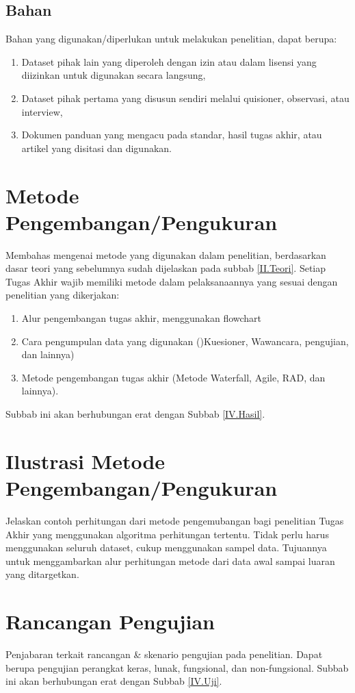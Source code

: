 \subsection{Bahan} \label{III.Bahan}
Bahan yang digunakan/diperlukan untuk melakukan penelitian, dapat berupa: \par
\begin{enumerate}[noitemsep]
	\item Dataset pihak lain yang diperoleh dengan izin atau dalam lisensi yang diizinkan untuk digunakan secara langsung,
	\item Dataset pihak pertama yang disusun sendiri melalui quisioner, observasi, atau interview,
	\item Dokumen panduan yang mengacu pada standar, hasil tugas akhir, atau artikel yang disitasi dan digunakan. 
\end{enumerate}

\section{Metode Pengembangan/Pengukuran} \label{III.Metode}
Membahas mengenai metode yang digunakan dalam penelitian, berdasarkan dasar teori yang sebelumnya sudah dijelaskan pada subbab \ref{II.Teori}. Setiap Tugas Akhir wajib memiliki metode dalam pelaksanaannya yang sesuai dengan penelitian yang dikerjakan: \par
\begin{enumerate}[noitemsep]
	\item Alur pengembangan tugas akhir, menggunakan flowchart
	\item Cara pengumpulan data yang digunakan ()Kuesioner, Wawancara, pengujian, dan lainnya)
	\item Metode pengembangan tugas akhir (Metode Waterfall, Agile, RAD, dan lainnya).
\end{enumerate}
Subbab ini akan berhubungan erat dengan Subbab \ref{IV.Hasil}. \par

\section{Ilustrasi Metode Pengembangan/Pengukuran} \label{III.Ilustrasi}
Jelaskan contoh perhitungan dari metode pengemubangan bagi penelitian Tugas Akhir yang menggunakan algoritma perhitungan tertentu. Tidak perlu harus menggunakan seluruh dataset, cukup menggunakan sampel data. Tujuannya untuk menggambarkan alur perhitungan metode dari data awal sampai luaran yang ditargetkan. \par

\section{Rancangan Pengujian} \label{III.Rancang Uji}
Penjabaran terkait rancangan \& skenario pengujian pada penelitian. Dapat berupa pengujian perangkat keras, lunak, fungsional, dan non-fungsional. Subbab ini akan berhubungan erat dengan Subbab \ref{IV.Uji}. \par